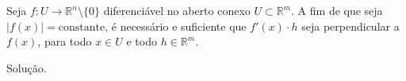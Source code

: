 \begin{homeworkProblem}[Seção 2-9]
  Seja $f : U \to \mathbb{R}^n \setminus \{0\}$ diferenciável no aberto conexo $U \subset \mathbb{R}^m$. A fim de que seja $|f(x)| = \text{constante}$, é necessário e suficiente que $f'(x)\cdot h$ seja perpendicular a $f(x)$, para todo $x \in U$ e todo $h \in \mathbb{R}^m$.
  \begin{solution}
    Solução.
  \end{solution}
\end{homeworkProblem}

